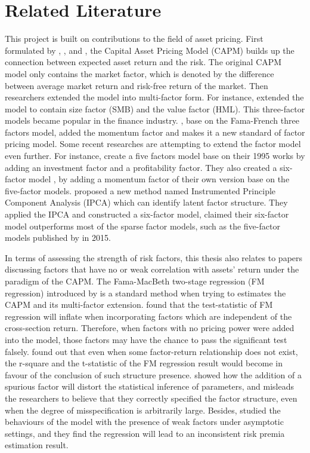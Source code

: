	\chapter{Related Literature}\label{Literature}
This project is built on contributions to the field of asset pricing.
First formulated by , , and , the Capital Asset Pricing Model (CAPM) builds up the connection between expected asset return and the risk.
The original CAPM model only contains the market factor, which is denoted by the difference between average market return and risk-free return of the market.
Then researchers extended the model into multi-factor form.
For instance,  extended the model to contain size factor (SMB) and the value factor (HML).
This three-factor models became popular in the finance industry.
, base on the Fama-French three factors model, added the momentum factor and makes it a new standard of factor pricing model.
Some recent researches are attempting to extend the factor model even further.
For instance,  create a five factors model base on their 1995 works by adding an investment factor and a profitability factor.
They also created a six-factor model \cite{Fama2018}, by adding a momentum factor of their own version base on the five-factor models.
 proposed a new method named Instrumented Principle Component Analysis (IPCA) which can identify latent factor structure.
They applied the IPCA and constructed a six-factor model, claimed their six-factor model outperforms most of the sparse factor models, such as the five-factor models published by \citeauthor{Fama2015} in 2015.

In terms of assessing the strength of risk factors, this thesis also relates to papers discussing factors that have no or weak correlation with assets' return under the paradigm of the CAPM.
The Fama-MacBeth two-stage regression (FM regression) introduced by  is a standard method when trying to estimates the CAPM and its multi-factor extension. 
 found that the test-statistic of FM regression will inflate when incorporating factors which are independent of the cross-section return.
Therefore, when factors with no pricing power were added into the model, those factors may have the chance to pass the significant test falsely.
 found out that even when some factor-return relationship does not exist, the r-square and the t-statistic of the FM regression result would become in favour of the conclusion of such structure presence. 
 showed how the addition of a spurious factor will distort the statistical inference of parameters, and misleads the researchers to believe that they correctly specified the factor structure, even when the degree of misspecification is arbitrarily large.
Besides,  studied the behaviours of the model with the presence of weak factors under asymptotic settings, and they find the regression will lead to an inconsistent risk premia estimation result.

